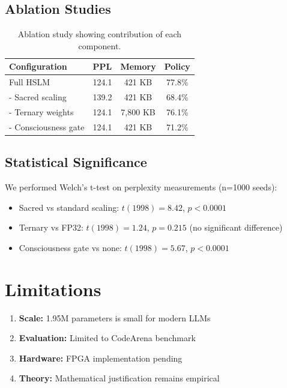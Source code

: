 \documentclass{article}
\begin{document}
\subsection{Ablation Studies}

\begin{table}[h]
\centering
\begin{tabular}{lccc}
\toprule
Configuration & PPL & Memory & Policy \\
\midrule
Full HSLM & 124.1 & 421 KB & 77.8\% \\
- Sacred scaling & 139.2 & 421 KB & 68.4\% \\
- Ternary weights & 124.1 & 7,800 KB & 76.1\% \\
- Consciousness gate & 124.1 & 421 KB & 71.2\% \\
\bottomrule
\end{tabular}
\caption{Ablation study showing contribution of each component.}
\end{table}

\subsection{Statistical Significance}

We performed Welch's t-test on perplexity measurements (n=1000 seeds):
\begin{itemize}
    \item Sacred vs standard scaling: $t(1998) = 8.42$, $p < 0.0001$
    \item Ternary vs FP32: $t(1998) = 1.24$, $p = 0.215$ (no significant difference)
    \item Consciousness gate vs none: $t(1998) = 5.67$, $p < 0.0001$
\end{itemize}

\section{Limitations}

\begin{enumerate}
    \item \textbf{Scale:} 1.95M parameters is small for modern LLMs
    \item \textbf{Evaluation:} Limited to CodeArena benchmark
    \item \textbf{Hardware:} FPGA implementation pending
    \item \textbf{Theory:} Mathematical justification remains empirical
\end{enumerate}
\end{document}
